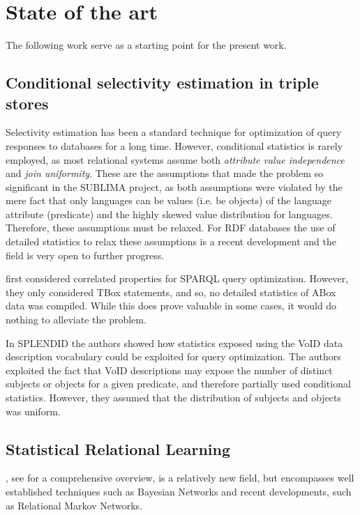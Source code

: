 
\section{State of the art}

The following work serve as a starting point for the present work.

\subsection{Conditional selectivity estimation in triple stores}

Selectivity estimation has been a standard technique for optimization
of query responses to databases for a long time. However, conditional
statistics is rarely employed, as most relational systems assume both
\emph{attribute value independence} and \emph{join
  uniformity}. These are the assumptions
that made the \langcase{} problem so significant in the SUBLIMA
project, as both assumptions were violated by the mere fact that only
languages can be values (i.e. be objects) of the language attribute
(predicate) and the highly skewed value distribution for
languages. Therefore, these assumptions must be relaxed. For RDF
databases the use of detailed statistics to relax these assumptions is
a recent development and the field is very open to further progress.

\cite{Lv:2009:SEC:1685170.1685590} first considered correlated
properties for SPARQL query optimization. However, they only
considered TBox statements, and so, no detailed statistics of ABox
data was compiled. While this does prove valuable in some cases, it
would do nothing to alleviate the \langcase{} problem.

In SPLENDID\cite{splendid} the authors showed how statistics exposed
using the VoID data description vocabulary\cite{void} could be
exploited for query optimization. The authors exploited the fact that
VoID descriptions may expose the number of distinct subjects or
objects for a given predicate, and therefore partially used
conditional statistics. However, they assumed that the distribution of
subjects and objects was uniform.

\subsection{Statistical Relational Learning}

\SRL, see \cite{srlbook} for a comprehensive overview, is a relatively
new field, but encompasses well established techniques such as
Bayesian Networks and recent developments, such as Relational Markov
Networks.

